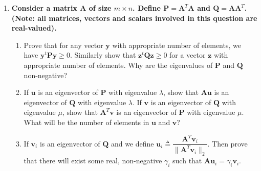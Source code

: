 \documentclass[11pt]{article}
\begin{document}
\begin{enumerate}
\newpage
\item {\bf Consider a matrix $\boldsymbol{A}$ of size $m \times n$. Define $\boldsymbol{P} = \boldsymbol{A}^T \boldsymbol{A}$ and $\boldsymbol{Q} = \boldsymbol{A}\boldsymbol{A}^T$. (Note: all matrices, vectors and scalars involved in this question are real-valued).}
\begin{enumerate}
\item Prove that for any vector $\boldsymbol{y}$ with appropriate number of elements, we have $\boldsymbol{y}^t \boldsymbol{Py} \geq 0$. Similarly show that $\boldsymbol{z}^t \boldsymbol{Qz} \geq 0$ for a vector $\boldsymbol{z}$ with appropriate number of elements. Why are the eigenvalues of $\boldsymbol{P}$ and $\boldsymbol{Q}$ non-negative?
\item If $\boldsymbol{u}$ is an eigenvector of $\boldsymbol{P}$ with eigenvalue $\lambda$, show that $\boldsymbol{Au}$ is an eigenvector of $\boldsymbol{Q}$ with eigenvalue $\lambda$. If $\boldsymbol{v}$ is an eigenvector of $\boldsymbol{Q}$ with eigenvalue $\mu$, show that $\boldsymbol{A}^T\boldsymbol{v}$ is an eigenvector of $\boldsymbol{P}$ with eigenvalue $\mu$. What will be the number of elements in $\boldsymbol{u}$ and $\boldsymbol{v}$?

\item If $\boldsymbol{v}_i$ is an eigenvector of $\boldsymbol{Q}$ and we define $\boldsymbol{u}_i \triangleq \dfrac{\boldsymbol{A}^T \boldsymbol{v}_i}{\|\boldsymbol{A}^T \boldsymbol{v}_i\|_2}$. Then prove that there will exist some real, non-negative $\gamma_i$ such that $\boldsymbol{Au}_i = \gamma_i \boldsymbol{v}_i$.


\end{enumerate}
\end{enumerate}
\end{document}
